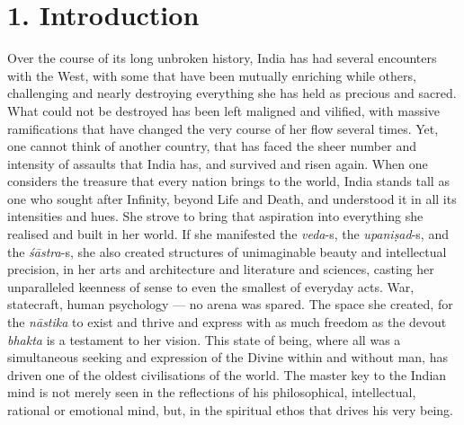\section*{1. Introduction}

Over the course of its long unbroken history, India has had several encounters with the West, with some that have been mutually enriching while others, challenging and nearly destroying everything she has held as precious and sacred. What could not be destroyed has been left maligned and vilified, with massive ramifications that have changed the very course of her flow several times. Yet, one cannot think of another country, that has faced the sheer number and intensity of assaults that India has, and survived and risen again. When one considers the treasure that every nation brings to the world, India stands tall as one who sought after Infinity, beyond Life and Death, and understood it in all its intensities and hues. She strove to bring that aspiration into everything she realised and built in her world. If she manifested the \textit{veda}-s, the \textit{upaniṣad}-s, and the \textit{śāstra}-s, she also created structures of unimaginable beauty and intellectual precision, in her arts and architecture and literature and sciences, casting her unparalleled keenness of sense to even the smallest of everyday acts. War, statecraft, human psychology — no arena was spared. The space she created, for the \textit{nāstika} to exist and thrive and express with as much freedom as the devout \textit{bhakta} is a testament to her vision. This state of being, where all was a simultaneous seeking and expression of the Divine within and without man, has driven one of the oldest civilisations of the world. The master key to the Indian mind is not merely seen in the reflections of his philosophical, intellectual, rational or emotional mind, but, in the spiritual ethos that drives his very being.

